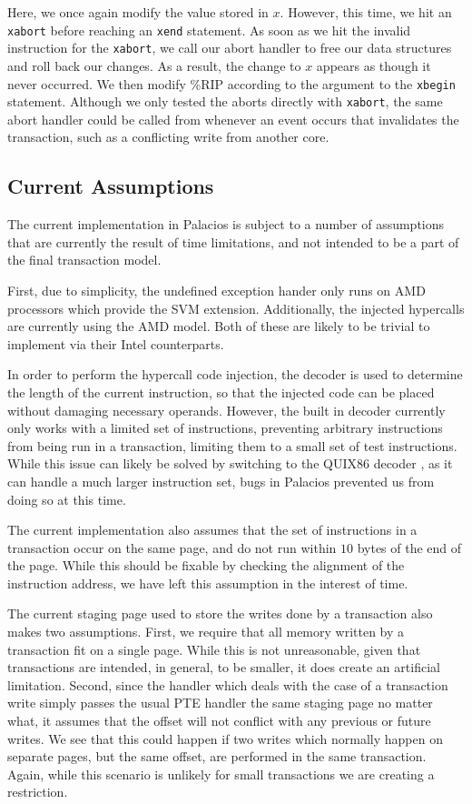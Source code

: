 \documentclass{acm_proc_article-sp}
\begin{document}
Here, we once again modify the value stored in $x$. However, this time, we hit
an \texttt{xabort} before reaching an \texttt{xend} statement.  As soon as we hit the invalid
instruction for the \texttt{xabort}, we call our abort handler to free our data
structures and roll back our changes. As a result, the change to $x$ appears as
though it never occurred. We then modify \%RIP according to the argument to the
\texttt{xbegin} statement. Although we only tested the aborts directly with \texttt{xabort}, the
same abort handler could be called from whenever an event occurs that
invalidates the transaction, such as a conflicting write from another core.

\subsection{Current Assumptions}

The current implementation in Palacios is subject to a number of assumptions
that are currently the result of time limitations, and not intended to be a
part of the final transaction model.

First, due to simplicity, the undefined exception hander only runs on AMD 
processors which provide the SVM extension. Additionally, the injected 
hypercalls are currently using the AMD model. Both of these are likely to be
trivial to implement via their Intel counterparts.  

In order to perform the hypercall code injection, the decoder is used to 
determine the length of the current instruction, so that the injected code
can be placed without damaging necessary operands. However, the built in
decoder currently only works with a limited set of instructions, preventing
arbitrary instructions from being run in a transaction, limiting them to a 
small set of test instructions. While this issue can likely be solved by 
switching to the QUIX86 decoder \cite{quix86site}, as it can handle a much larger
instruction set, bugs in Palacios prevented us from doing so at this time.

The current implementation also assumes that the set of instructions in a 
transaction occur on the same page, and do not run within $10$ bytes of the
end of the page. While this should be fixable by checking the alignment of
the instruction address, we have left this assumption in the interest of 
time. 

The current staging page used to store the writes done by a transaction also
makes two assumptions. First, we require that all memory written by a 
transaction fit on a single page. While this is not unreasonable, given that
transactions are intended, in general, to be smaller, it does create an
artificial limitation. Second, since the handler which deals with the case
of a transaction write simply passes the usual PTE handler the same staging
page no matter what, it assumes that the offset will not conflict with any
previous or future writes. We see that this could happen if two writes which
normally happen on separate pages, but the same offset, are performed in the
same transaction. Again, while this scenario is unlikely for small transactions
we are creating a restriction.
 
\end{document}
